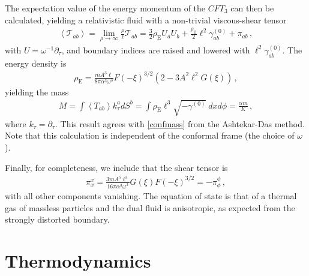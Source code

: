 \documentclass[
twoside,
openright,
frontopenright,
]{dmathesis}
\newcommand{\tcr}{\textcolor{red}}
\begin{document}
The expectation value of the energy momentum of the $CFT_{3}$ can then be
calculated, yielding a relativistic fluid with a non-trivial viscous-shear
tensor
\begin{align}
\left\langle \mathcal{T}_{ab}\right\rangle =\lim_{\rho \to
\infty }\frac{\rho }{\ell}\mathcal{T}_{ab}= \frac32 \rho _{\mathrm{E}}
U_{a}U_{b}+\frac{\rho_\mathrm{E}}2 \ell^{2} \gamma^{(0)} _{ab}+\pi _{ab}\,,
\end{align}
with $U=\omega^{-1}\partial_\tau$, and boundary indices are
raised and lowered with $\ell^{2}\gamma^{(0)}_{ab}$.
The energy density is
\begin{align}
\rho _{\mathrm{E}}= \frac{mA^3\ell}{8\pi \alpha^3\omega^3}F(-\xi)^{3/2}
(2-3A^{2}\ell^{2}G(\xi))\,,
\end{align}
yielding the mass
\begin{align}
M= \int \left\langle T_{ab}\right\rangle k_\tau^a dS^b = \int \rho _{\mathrm{E}} \ell^3 \sqrt{-\gamma^{(0)}}~dxd\phi
=\frac{\alpha m}{K}\,,
\end{align}
where $k_\tau = \partial_\tau$. This result agrees with \cref{confmass} from the
Ashtekar-Das method. Note that this calculation is independent of the conformal
frame (the choice of $\omega$).

Finally, for completeness, we include that the shear tensor is
\begin{align}
\pi^x_x= \frac{3mA^5\ell^3}{16\pi \alpha^3\omega^{3}}
G(\xi)F(-\xi)^{3/2}=-\pi^\phi_\phi\,,
\end{align}
with all other components vanishing. The equation of state is that of a thermal
gas of massless particles and the dual fluid is anisotropic, as expected from
the strongly distorted boundary.

\section{Thermodynamics}
\label{sec:thermodynamics}
\end{document}

